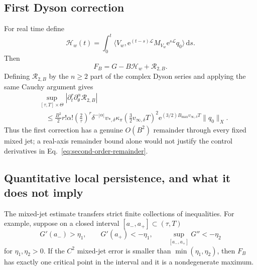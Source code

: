 \documentclass[aps,physrev,onecolumn,amsmath,amssymb,longbibliography]{revtex4-2}
\newcommand{\dd}{\mathrm d}
\newcommand{\e}{\mathrm e}
\newcommand{\Lfree}{\mathcal L}
\begin{document}
\subsection{First Dyson correction}

For real time define
\begin{equation}
 \mathcal H_w(t)=\int_0^t
 \langle V_w,\e^{(t-s)\Lfree}M_{V_w}
 \e^{s\Lfree}q_0\rangle\,\dd s.
 \label{eq:first-dyson-correction}
\end{equation}
Then
\begin{equation}
 F_B=G-B\mathcal H_w+\mathcal R_{2,B}.
 \label{eq:first-correction-expansion}
\end{equation}
Defining \(\mathcal R_{2,B}\) by the \(n\ge2\) part of the complex Dyson
series and applying the same Cauchy argument gives
\begin{align}
 &\sup_{[\tau,T]\times\Theta}
 |\partial_t^r\partial_\theta^\alpha\mathcal R_{2,B}|
 \nonumber\\
 &\quad\le
 \frac{B^2}{2}r!\alpha!\left(\frac2\tau\right)^r
 \delta^{-|\alpha|}v_{*,\delta}\kappa_\pi
 \left(\frac32v_{\infty,\delta}T\right)^2
 \e^{(3/2)B_{\max}v_{\infty,\delta}T}\|q_0\|_X.
 \label{eq:second-order-remainder}
\end{align}
Thus the first correction has a genuine \(O(B^2)\) remainder through every
fixed mixed jet; a real-axis remainder bound alone would not justify the
control derivatives in Eq.~\eqref{eq:second-order-remainder}.

\subsection{Quantitative local persistence, and what it does not imply}

The mixed-jet estimate transfers strict finite collections of inequalities.
For example, suppose on a closed interval \([a_-,a_+]\subset(\tau,T)\)
\begin{equation}
 G'(a_-)>\eta_1,\qquad G'(a_+)<-\eta_1,\qquad
 \sup_{[a_-,a_+]}G''<-\eta_2
 \label{eq:mode-margins}
\end{equation}
for \(\eta_1,\eta_2>0\).  If the \(C^2\) mixed-jet error is smaller than
\(\min(\eta_1,\eta_2)\), then \(F_B\) has exactly one critical point in the
interval and it is a nondegenerate maximum.
\end{document}
